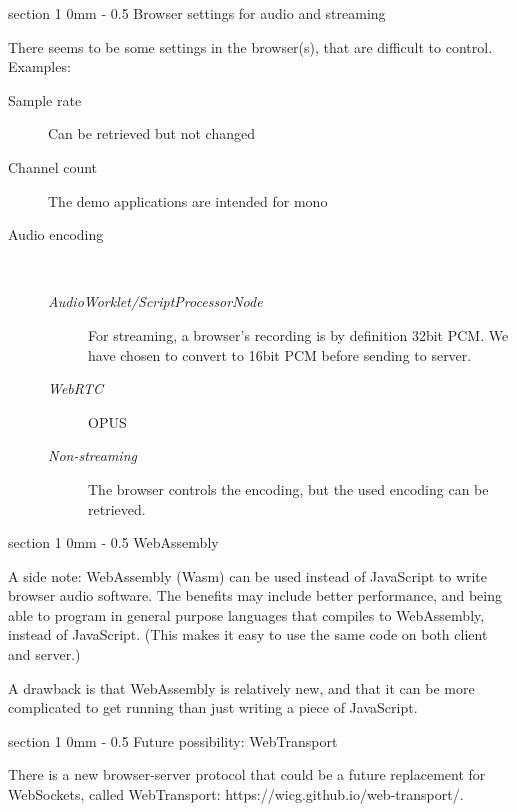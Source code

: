 \documentclass[11pt, a4paper, twoside]{article}
\makeatletter
\renewcommand{\section}{\@startsection
  {section}%
  {1}%
  {0mm}%
  {-\baselineskip}%
  {0.5\baselineskip}%
  {\bfseries\sffamily\Large}}%
\makeatother
\begin{document}
\section{Browser settings for audio and streaming}

There seems to be some settings in the browser(s), that are difficult to control. Examples:

\begin{description}
\item[Sample rate] Can be retrieved but not changed
\item[Channel count] The demo applications are intended for mono
\item[Audio encoding]\ \\[-14pt]
  \begin{description}
  \item[\em{AudioWorklet/ScriptProcessorNode}] For streaming, a browser's recording is by definition 32bit PCM. We have chosen to convert to 16bit PCM before sending to server.
  \item[\em{WebRTC}] OPUS
  \item[\em{ Non-streaming}] The browser controls the encoding, but the used encoding can be retrieved.
    
  \end{description}

\end{description}


\section{WebAssembly}

A side note: WebAssembly (Wasm) can be used instead of JavaScript to
write browser audio software. The benefits may include better
performance, and being able to program in general purpose languages
that compiles to WebAssembly, instead of JavaScript. (This makes it
easy to use the same code on both client and server.)

A drawback is that WebAssembly is relatively new, and that it can be
more complicated to get running than just writing a piece of JavaScript.



\section{Future possibility: WebTransport}

There is a new browser-server protocol that could be a
future replacement for WebSockets, called WebTransport:
https://wicg.github.io/web-transport/.
\end{document}
